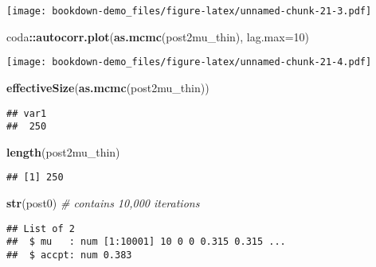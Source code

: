 \documentclass[]{book}
\newenvironment{Shaded}{\begin{snugshade}}{\end{snugshade}}
\newcommand{\KeywordTok}[1]{\textcolor[rgb]{0.13,0.29,0.53}{\textbf{#1}}}
\newcommand{\DataTypeTok}[1]{\textcolor[rgb]{0.13,0.29,0.53}{#1}}
\newcommand{\DecValTok}[1]{\textcolor[rgb]{0.00,0.00,0.81}{#1}}
\newcommand{\CommentTok}[1]{\textcolor[rgb]{0.56,0.35,0.01}{\textit{#1}}}
\newcommand{\OperatorTok}[1]{\textcolor[rgb]{0.81,0.36,0.00}{\textbf{#1}}}
\newcommand{\NormalTok}[1]{#1}
\begin{document}
\texttt{[image: bookdown-demo\_files/figure-latex/unnamed-chunk-21-3.pdf]}

\begin{Shaded}
\begin{Highlighting}[]
\NormalTok{coda}\OperatorTok{::}\KeywordTok{autocorr.plot}\NormalTok{(}\KeywordTok{as.mcmc}\NormalTok{(post2mu_thin), }\DataTypeTok{lag.max=}\DecValTok{10}\NormalTok{)}
\end{Highlighting}
\end{Shaded}

\texttt{[image: bookdown-demo\_files/figure-latex/unnamed-chunk-21-4.pdf]}

\begin{Shaded}
\begin{Highlighting}[]
\KeywordTok{effectiveSize}\NormalTok{(}\KeywordTok{as.mcmc}\NormalTok{(post2mu_thin))}
\end{Highlighting}
\end{Shaded}

\begin{verbatim}
## var1 
##  250
\end{verbatim}

\begin{Shaded}
\begin{Highlighting}[]
\KeywordTok{length}\NormalTok{(post2mu_thin)}
\end{Highlighting}
\end{Shaded}

\begin{verbatim}
## [1] 250
\end{verbatim}

\begin{Shaded}
\begin{Highlighting}[]
\KeywordTok{str}\NormalTok{(post0) }\CommentTok{# contains 10,000 iterations}
\end{Highlighting}
\end{Shaded}

\begin{verbatim}
## List of 2
##  $ mu   : num [1:10001] 10 0 0 0.315 0.315 ...
##  $ accpt: num 0.383
\end{verbatim}

\begin{Shaded}
\end{Shaded}
\end{document}
